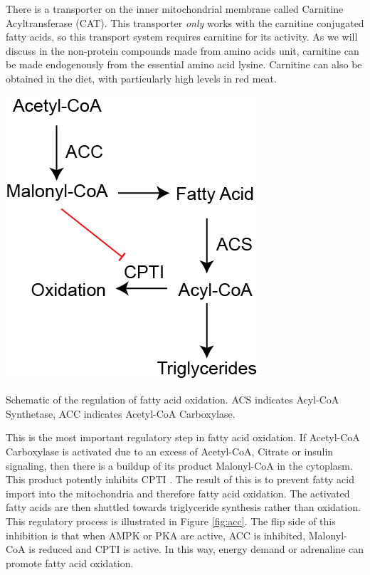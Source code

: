 \documentclass{tufte-handout}
\begin{document}
There is a transporter on the inner mitochondrial membrane called Carnitine Acyltransferase (CAT).  This transporter \emph{only} works with the carnitine conjugated fatty acids, so this transport system requires carnitine for its activity.  As we will discuss in the non-protein compounds made from amino acids unit, carnitine can be made endogenously from the essential amino acid lysine.  Carnitine can also be obtained in the diet, with particularly high levels in red meat.


\begin{marginfigure}
\includegraphics{figures/fatty-acid-oxidation.png}
\caption{Schematic of the regulation of fatty acid oxidation.  ACS indicates Acyl-CoA Synthetase, ACC indicates Acetyl-CoA Carboxylase.}
\label{fig:acc}
\end{marginfigure}


  This is the most important regulatory step in fatty acid oxidation.  If Acetyl-CoA Carboxylase is activated due to an excess of Acetyl-CoA, Citrate or insulin signaling, then there is a buildup of its product Malonyl-CoA in the cytoplasm.  This product potently inhibits CPTI \citep{McGarry1979}.  The result of this is to prevent fatty acid import into the mitochondria and therefore fatty acid oxidation.  The activated fatty acids are then shuttled towards triglyceride synthesis rather than oxidation.  This regulatory process is illustrated in Figure \ref{fig:acc}.  The flip side of this inhibition is that when AMPK or PKA are active, ACC is inhibited, Malonyl-CoA is reduced and CPTI is active.  In this way, energy demand or adrenaline can promote fatty acid oxidation.
\end{document}
